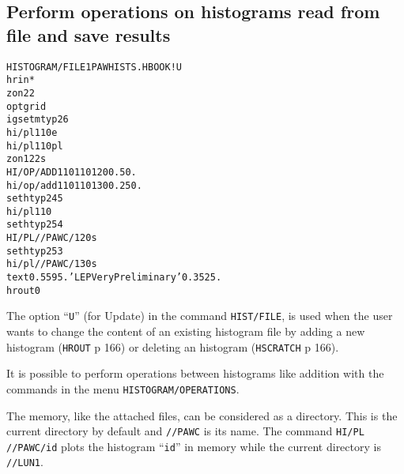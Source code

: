 \subsection*{Perform operations on histograms read from file and save
  results}
\begin{alltt}
     HISTOGRAM/FILE 1 PAWHISTS.HBOOK ! U
      hrin  *
      zon 2 2
      opt grid
      igset mtyp 26
      hi/pl 110 e
      hi/pl 110 pl
      zon 1 2 2 s
     HI/OP/ADD 110 110 120 0.5 0.
      hi/op/add 110 110 130 0.25 0.
      set htyp 245
      hi/pl 110
      set htyp 254
     HI/PL //PAWC/120 s
      set htyp 253
      hi/pl //PAWC/130 s
      text 0.55 95. 'LEP Very Preliminary' 0.35 25.
      hrout 0
\end{alltt} 
\begin{DinglistE}
\item The option ``{\tt U}'' (for Update) in the command {\tt HIST/FILE}, is
      used when the user wants to change the content of an existing histogram
      file by adding a new histogram ({\tt HROUT} p 166) or deleting an
      histogram ({\tt HSCRATCH} p 166).
\item It is possible to perform operations between histograms like addition
      with the commands in the menu {\tt HISTOGRAM/OPERATIONS}.
\item The memory, like the attached files, can be considered as a directory.
      This is the current directory by default and {\tt //PAWC} is its name.
      The command {\tt HI/PL //PAWC/id} plots the histogram ``{\tt id}'' in
      memory while the current directory is {\tt //LUN1}.
\end{DinglistE}
\clearpage
